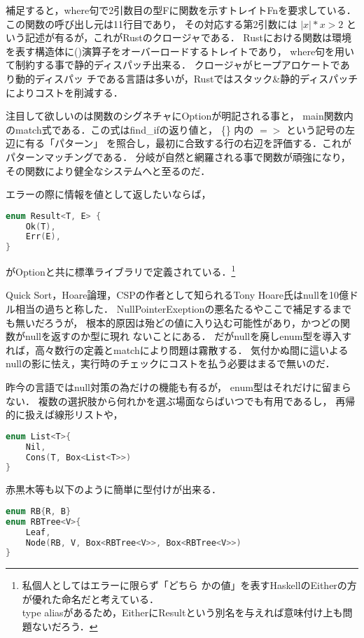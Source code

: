 補足すると，where句で2引数目の型Fに関数を示すトレイトFnを要求している．
この関数の呼び出し元は11行目であり，
その対応する第2引数には $|x| *x > 2$ という記述が有るが，これがRustのクロージャである．
Rustにおける関数は環境を表す構造体に()演算子をオーバーロードするトレイトであり，
where句を用いて制約する事で静的ディスパッチ出来る．
クロージャがヒープアロケートであり動的ディスパッ
チである言語は多いが，Rustではスタック\&静的ディスパッチによりコストを削減する．

注目して欲しいのは関数のシグネチャにOptionが明記される事と，
main関数内のmatch式である．この式はfind\_ifの返り値と，
 \{\} 内の $=>$ という記号の左辺に有る「パターン」
を照合し，最初に合致する行の右辺を評価する．これがパターンマッチングである．
分岐が自然と網羅される事で関数が頑強になり，その関数により健全なシステムへと至るのだ．

エラーの際に情報を値として返したいならば，

\begin{lstlisting}[language={C++},caption=Result型,label=result_t]
enum Result<T, E> {
    Ok(T),
    Err(E),
}
\end{lstlisting}

がOptionと共に標準ライブラリで定義されている．\footnote{私個人としてはエラーに限らず「どちら
  かの値」を表すHaskellのEitherの方が優れた命名だと考えている． \\
  type aliasがあるため，EitherにResultという別名を与えれば意味付け上も問題ないだろう．}

Quick Sort，Hoare論理，CSPの作者として知られるTony Hoare氏はnullを10億ドル相当の過ちと称した．
NullPointerExeptionの悪名たるやここで補足するまでも無いだろうが，
根本的原因は殆どの値に入り込む可能性があり，かつどの関数がnullを返すのか型に現れ
ないことにある．
だがnullを廃しenum型を導入すれば，高々数行の定義とmatchにより問題は霧散する．
気付かぬ間に這いよるnullの影に怯え，実行時のチェックにコストを払う必要はまるで無いのだ．

昨今の言語ではnull対策の為だけの機能も有るが，
enum型はそれだけに留まらない．
複数の選択肢から何れかを選ぶ場面ならばいつでも有用であるし，
再帰的に扱えば線形リストや，

\begin{lstlisting}[language={C++},caption=線形リスト,label=list_t]
enum List<T>{
    Nil,
    Cons(T, Box<List<T>>)
}
\end{lstlisting}

赤黒木等も以下のように簡単に型付けが出来る．

\begin{lstlisting}[language={C++},caption=赤黒木,label=abt_t]
enum RB{R, B}
enum RBTree<V>{
    Leaf,
    Node(RB, V, Box<RBTree<V>>, Box<RBTree<V>>)
}
\end{lstlisting}

